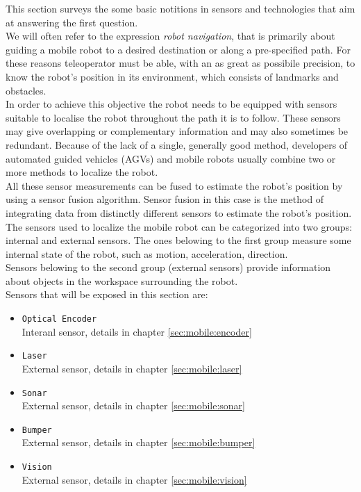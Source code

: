 This section surveys the some basic notitions in sensors 
and technologies that aim at answering the
first question.
\\
We will often refer to the expression \textit{robot navigation},
that is primarily about guiding a mobile robot to a desired destination
or along a pre-specified path. For these reasons teleoperator must
be able, with an as great as possibile precision, to know the robot's
position in its environment, which consists of landmarks and obstacles.
\\
In order to achieve this objective the robot needs to be equipped with
sensors suitable to localise the robot throughout the path it is to follow.
These sensors may give overlapping or complementary information and may
also sometimes be redundant. Because of the lack of a single, generally
good method, developers of  automated guided vehicles (AGVs) and mobile
robots usually combine two or more methods to localize the robot.
\\
All these sensor measurements can be fused to estimate the robot's
position by using a sensor fusion algorithm. Sensor fusion
in this case is the method of integrating data from distinctly
different sensors to estimate the robot's position.
\\
The sensors used to localize the mobile robot can be categorized into
two groups: internal and external sensors. The ones belowing to the first
group measure some internal state of the robot, such as motion, acceleration,
direction.
\\
Sensors belowing to the second group (external sensors) provide information
about objects in the workspace surrounding the robot.
\\
Sensors that will be exposed in this section are:
\begin{itemize}
\item \texttt{Optical Encoder} \\
  Interanl sensor, details in chapter \ref{sec:mobile:encoder}
\item \texttt{Laser} \\
  External sensor, details in chapter \ref{sec:mobile:laser}
\item \texttt{Sonar} \\
  External sensor, details in chapter \ref{sec:mobile:sonar}
\item \texttt{Bumper} \\
  External sensor, details in chapter \ref{sec:mobile:bumper}
\item \texttt{Vision} \\
  External sensor, details in chapter \ref{sec:mobile:vision}
\end{itemize}

